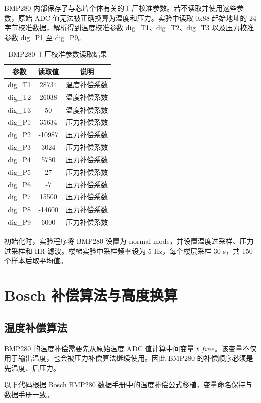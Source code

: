 \documentclass[UTF8,a4paper,12pt]{ctexart}
\begin{document}
BMP280 内部保存了与芯片个体有关的工厂校准参数。若不读取并使用这些参数，原始 ADC 值无法被正确换算为温度和压力。实验中读取 0x88 起始地址的 24 字节校准数据，解析得到温度校准参数 dig\_T1、dig\_T2、dig\_T3 以及压力校准参数 dig\_P1 至 dig\_P9。

\begin{table}[H]
\centering
\caption{BMP280 工厂校准参数读取结果}
\begin{tabular}{ccc}
\toprule
参数 & 读取值 & 说明 \\
\midrule
dig\_T1 & 28734 & 温度补偿系数 \\
dig\_T2 & 26038 & 温度补偿系数 \\
dig\_T3 & 50 & 温度补偿系数 \\
dig\_P1 & 35634 & 压力补偿系数 \\
dig\_P2 & -10987 & 压力补偿系数 \\
dig\_P3 & 3024 & 压力补偿系数 \\
dig\_P4 & 5780 & 压力补偿系数 \\
dig\_P5 & 27 & 压力补偿系数 \\
dig\_P6 & -7 & 压力补偿系数 \\
dig\_P7 & 15500 & 压力补偿系数 \\
dig\_P8 & -14600 & 压力补偿系数 \\
dig\_P9 & 6000 & 压力补偿系数 \\
\bottomrule
\end{tabular}
\end{table}

初始化时，实验程序将 BMP280 设置为 normal mode，并设置温度过采样、压力过采样和 IIR 滤波。楼梯实验中采样频率设为 5 Hz，每个楼层采样 30 s，共 150 个样本后取平均值。

\newpage

\section{Bosch 补偿算法与高度换算}

\subsection{温度补偿算法}

BMP280 的温度补偿需要先从原始温度 ADC 值计算中间变量 $t\_fine$。该变量不仅用于输出温度，也会被压力补偿算法继续使用。因此 BMP280 的补偿顺序必须是先温度、后压力。

以下代码根据 Bosch BMP280 数据手册中的温度补偿公式移植，变量命名保持与数据手册一致。
\end{document}
